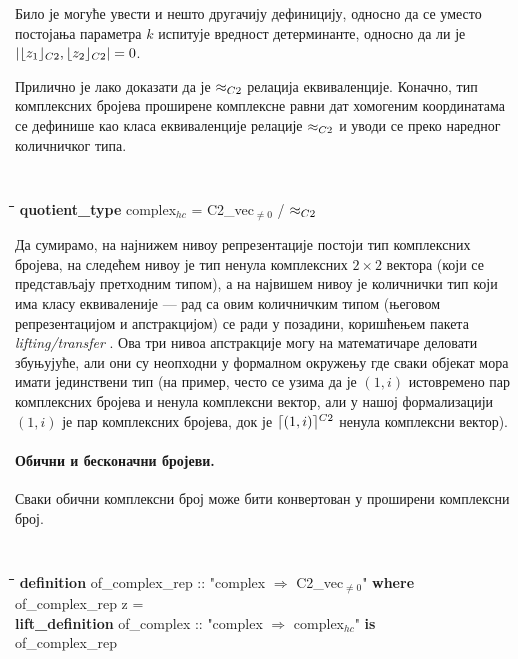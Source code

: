 \noindent Било је могуће увести и нешто другачију дефиницију, односно
да се уместо постојања параметра $k$ испитује вредност детерминанте,
односно да ли је $|\lfloor z_1\rfloor_{C2}, \lfloor z_2\rfloor_{C2}| = 0$.

\noindent Прилично је лако доказати да је $\approx_{C2}$ релација
еквиваленције. Коначно, тип комплексних бројева проширене комплексне
равни дат хомогеним координатама се дефинише као класа еквиваленције
релације $\approx_{C2}$ и уводи се преко наредног количничког типа.

{\tt
\begin{tabbing}
\hspace{5mm}\=\hspace{5mm}\=\hspace{5mm}\=\hspace{5mm}\=\hspace{5mm}\=\kill
\textbf{quotient\_type} complex$_{hc}$ = C2\_vec$_{\neq 0}$ / $\approx_{C2}$
\end{tabbing}
}

Да сумирамо, на најнижем нивоу репрезентације постоји тип комплексних
бројева, на следећем нивоу је тип ненула комплексних $2\times 2$
вектора (који се представљају претходним типом), а на највишем нивоу
је количнички тип који има класу еквиваленије --- рад са овим
количничким типом (његовом репрезентацијом и апстракцијом) се ради у
позадини, коришћењем пакета \emph{lifting/transfer} \cite{lifting-transfer}.
Ова три нивоа апстракције могу на математичаре деловати збуњујуће, али
они су неопходни у формалном окружењу где сваки објекат мора имати
јединствени тип (на пример, често се узима да је $(1, i)$ истовремено
пар комплексних бројева и ненула комплексни вектор, али у нашој
формализацији $(1, i)$ је пар комплексних бројева, док је $\lceil(1,
  i)\rceil^{C2}$ ненула комплексни вектор). 

\paragraph{Обични и бесконачни бројеви.}
Сваки обични комплексни број може бити конвертован у проширени
комплексни број.

{\tt
\begin{tabbing}
\hspace{5mm}\=\hspace{5mm}\=\hspace{5mm}\=\hspace{5mm}\=\hspace{5mm}\=\kill
\textbf{definition} of\_complex\_rep :: "complex $\Rightarrow$ C2\_vec$_{\neq 0}$" \textbf{where}\\
\>of\_complex\_rep z = \\
\textbf{lift\_definition} of\_complex :: "complex $\Rightarrow$ complex$_{hc}$" \textbf{is}\\
\>  of\_complex\_rep
\end{tabbing}
}

